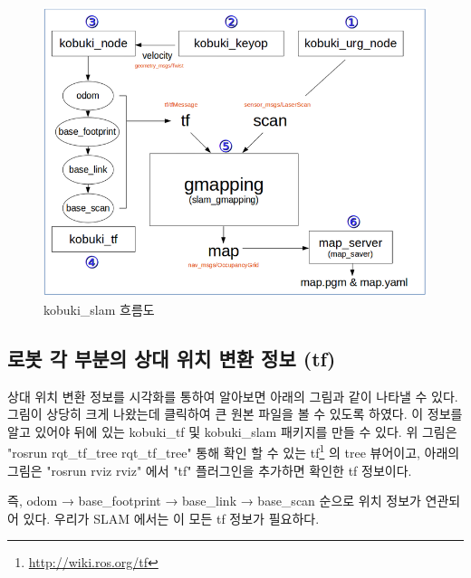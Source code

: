 \begin{figure}[h]
\centering
\includegraphics[width=\columnwidth]{pictures/chapter11/slam_flow.png}
\caption{kobuki\_slam 흐름도}
\end{figure}

\subsection{로봇 각 부분의 상대 위치 변환 정보 (tf)}

상대 위치 변환 정보를 시각화를 통하여 알아보면 아래의 그림과 같이 나타낼 수 있다. 그림이 상당히 크게 나왔는데 클릭하여 큰 원본 파일을 볼 수 있도록 하였다. 이 정보를 알고 있어야 뒤에 있는 kobuki\_tf 및 kobuki\_slam 패키지를 만들 수 있다. 위 그림은 "rosrun rqt\_tf\_tree rqt\_tf\_tree" 통해 확인 할 수 있는 tf\footnote{\url{http://wiki.ros.org/tf}} 의 tree 뷰어이고, 아래의 그림은 "rosrun rviz rviz" 에서 "tf" 플러그인을 추가하면 확인한 tf 정보이다. 

즉, odom → base\_footprint → base\_link → base\_scan 순으로 위치 정보가 연관되어 있다. 우리가 SLAM 에서는 이 모든 tf 정보가 필요하다.

